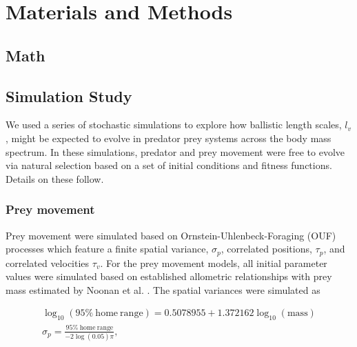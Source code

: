 \documentclass[12pt]{article}
\begin{document}
\section*{Materials and Methods}


\subsection*{Math}













\subsection*{Simulation Study}

We used a series of stochastic simulations to explore how ballistic length scales, $l_v$, might be expected to evolve in predator prey systems across the body mass spectrum. In these simulations, predator and prey movement were free to evolve via natural selection based on a set of initial conditions and fitness functions. Details on these follow.

\subsubsection*{Prey movement}

Prey movement were simulated based on Ornstein-Uhlenbeck-Foraging (OUF) processes \cite{Fleming:2014jr,Fleming:2014gd} which feature a finite spatial variance, $\sigma_p$, correlated positions, $\tau_p$, and correlated velocities $\tau_v$. For the prey movement models, all initial parameter values were simulated based on established allometric relationships with prey mass estimated by Noonan et al. \cite{Noonan:2020}. The spatial variances were simulated as

\begin{gather}
\log_{10}(\mathrm{95\%~home~range}) = 0.5078955 + 1.372162 \log_{10}(\mathrm{mass}) \\
\sigma_p = \frac{\mathrm{95\%~home~range}}{-2 \log(0.05)  \pi},
\end{gather}
\end{document}

